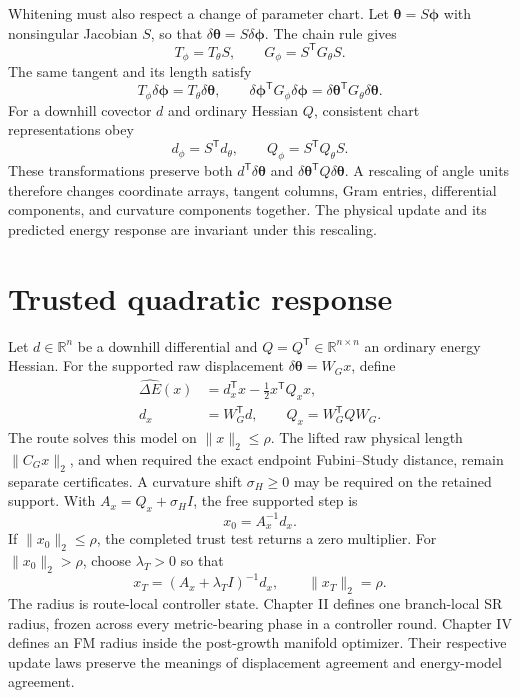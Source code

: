 \documentclass[10pt,twocolumn]{article}
\begin{document}
Whitening must also respect a change of parameter chart. Let
\(\bm\theta=S\bm\phi\) with nonsingular Jacobian \(S\), so that
\(\delta\bm\theta=S\delta\bm\phi\). The chain rule gives
\begin{equation}
T_\phi=T_\theta S,\qquad
G_\phi=S^{\mathsf T}G_\theta S.
\label{eq:chart-metric-transform}
\end{equation}
The same tangent and its length satisfy
\begin{equation}
T_\phi\delta\bm\phi=T_\theta\delta\bm\theta,\qquad
\delta\bm\phi^{\mathsf T}G_\phi\delta\bm\phi
=\delta\bm\theta^{\mathsf T}G_\theta\delta\bm\theta.
\label{eq:chart-length-invariance}
\end{equation}
For a downhill covector \(d\) and ordinary Hessian \(Q\), consistent chart
representations obey
\begin{equation}
d_\phi=S^{\mathsf T}d_\theta,\qquad
Q_\phi=S^{\mathsf T}Q_\theta S.
\label{eq:chart-model-transform}
\end{equation}
These transformations preserve both
\(d^{\mathsf T}\delta\bm\theta\) and
\(\delta\bm\theta^{\mathsf T}Q\delta\bm\theta\). A rescaling of angle units
therefore changes coordinate arrays, tangent columns, Gram entries,
differential components, and curvature components together. The physical
update and its predicted energy response are invariant under this rescaling.

\section*{Trusted quadratic response}

Let \(d\in\mathbb R^n\) be a downhill differential and
\(Q=Q^{\mathsf T}\in\mathbb R^{n\times n}\) an ordinary energy Hessian.
For the supported raw displacement \(\delta\bm\theta=W_Gx\), define
\begin{align}
\widehat{\Delta E}(x)
&=d_x^{\mathsf T}x-\tfrac12x^{\mathsf T}Q_xx,\nonumber\\
d_x&=W_G^{\mathsf T}d,\qquad
Q_x=W_G^{\mathsf T}QW_G.
\label{eq:supported-quadratic}
\end{align}
The route solves this model on \(\|x\|_2\leq\rho\). The lifted raw physical
length \(\|C_Gx\|_2\), and when required the exact endpoint
Fubini--Study distance, remain separate certificates. A curvature shift
\(\sigma_H\geq0\) may be required on the retained support. With
\(A_x=Q_x+\sigma_HI\), the free supported step is
\begin{equation}
x_0=A_x^{-1}d_x.
\label{eq:free-step}
\end{equation}
If \(\|x_0\|_2\leq\rho\), the completed trust test returns a zero multiplier.
For \(\|x_0\|_2>\rho\), choose \(\lambda_T>0\) so that
\begin{equation}
x_T=(A_x+\lambda_TI)^{-1}d_x,\qquad \|x_T\|_2=\rho.
\label{eq:boundary-step}
\end{equation}
The radius is route-local controller state. Chapter II defines one branch-local
SR radius, frozen across every
metric-bearing phase in a controller round. Chapter IV defines an FM radius
inside the post-growth manifold optimizer. Their respective update laws
preserve the meanings of displacement agreement and energy-model agreement.
\end{document}
